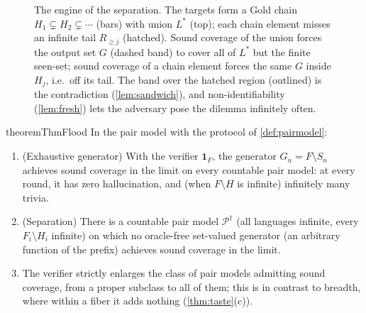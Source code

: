 \documentclass[11pt]{article}
\numberwithin{equation}{section}
\newcommand{\mc}[1]{\mathcal{#1}}
\newcommand{\Amb}{F}
\newcommand{\Val}{H}
\newcommand{\Pairs}{\mc{P}}
\newcommand{\Seen}{S}
\theoremstyle{plain}
\theoremstyle{definition}
\theoremstyle{remark}
\begin{document}
\begin{figure}[t]
{
}
\caption{The engine of the separation. The targets form a Gold chain
$\Val_1 \subsetneq \Val_2 \subsetneq \cdots$ (bars) with union $L^*$ (top); each
chain element misses an infinite tail $R_{\ge j}$ (hatched). Sound coverage of
the union forces the output set $G$ (dashed band) to cover all of $L^*$ but the
finite seen-set; sound coverage of a chain element forces the same $G$ inside
$\Val_j$, i.e.\ off its tail. The band over the hatched region (outlined) is
the contradiction (\cref{lem:sandwich}), and non-identifiability
(\cref{lem:fresh}) lets the adversary pose the dilemma infinitely often.}
\label{fig:sandwich}
\end{figure}

\begin{restatable}{theorem}{ThmFlood}\label{thm:flood}
In the pair model with the protocol of \cref{def:pairmodel}:
\begin{enumerate}[label=\textup{(\alph*)}]
  \item \textup{(Exhaustive generator)} With the verifier $\mathbf 1_{\Amb}$, the generator
    $G_n = \Amb \setminus \Seen_n$ achieves sound coverage in the limit on every countable
    pair model: at every round, it has zero hallucination, and (when $\Amb \setminus \Val$ is
    infinite) infinitely many trivia.
  \item \textup{(Separation)} There is a countable pair model $\Pairs^{\dagger}$ (all
    languages infinite, every $\Amb_i \setminus \Val_i$ infinite) on which no oracle-free
    set-valued generator (an arbitrary function of the prefix) achieves sound coverage in the
    limit.
  \item The verifier strictly enlarges the class of pair models admitting sound coverage, from
    a proper subclass to all of them; this is in contrast to breadth, where within a fiber it
    adds nothing \textup{(\cref{thm:taste}(c))}.
\end{enumerate}
\end{restatable}
\end{document}
